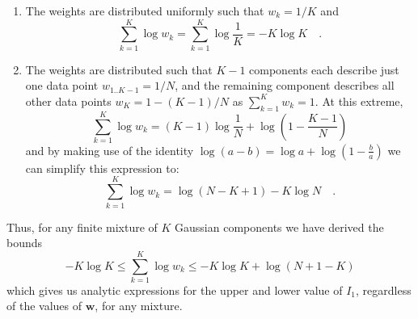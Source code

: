 \documentclass{elsarticle}
\newcommand{\vect}[1]{\boldsymbol{\mathbf{#1}}}
\renewcommand{\vec}[1]{\vect{#1}}
\def\weight{w}
\begin{document}
\begin{enumerate}
    \item The weights are distributed uniformly such that $w_k = 1/K$ and
          \begin{equation}
                \sum_{k=1}^{K}\log\weight_k = \sum_{k=1}^{K}\log{\frac{1}{K}} =-K\log{K} \quad .
          \end{equation}
    \item The weights are distributed such that $K - 1$ components each 
          describe just one data point $w_{1..K-1} = 1/N$, and the remaining 
          component describes all other data points $w_{K} = 1 - (K-1)/N$
          as $\sum_{k=1}^{K}\weight_k = 1$. At this extreme,
          \begin{equation}
                \sum_{k=1}^{K}\log\weight_k = (K-1)\log\frac{1}{N} + \log\left(1 - \frac{K - 1}{N}\right)
          \end{equation}
          \noindent{}and by making use of the identity 
            $\log{(a-b)} = \log{a} + \log{(1 - \frac{b}{a})}$
          we can simplify this expression to:
          \begin{equation}
                \sum_{k=1}^{K}\log\weight_k = \log{(N-K+1)} - K\log{N} \quad .
          \end{equation}
\end{enumerate}

\noindent{}Thus, for any finite mixture of $K$ Gaussian components we have 
derived the bounds
\begin{equation}
-K\log{K} \leq \sum_{k=1}^{K}\log\weight_k \leq - K\log{K} + \log(N + 1 - K)
\end{equation}
\noindent{}which gives us analytic expressions for the upper and lower value 
of $I_1$, regardless of the values of $\vec{\weight}$, for any mixture.
\end{document}
